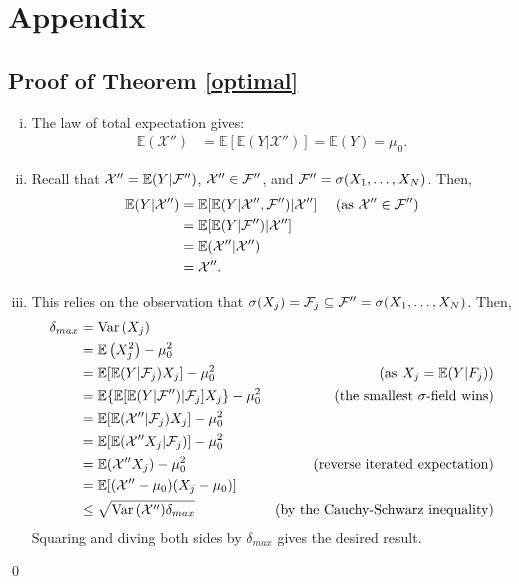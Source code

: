 \documentclass[11pt]{article}
\newcommand{\E}{\mathbb{E}}
\theoremstyle{definition}
\theoremstyle{definition}
\def\F{{\cal F}}
\def\E{{\mathbb E}}
\def\Var{{\rm Var}\,}
\begin{document}
\appendix
\section{Appendix}
\subsection{Proof of Theorem \ref{optimal}}
\begin{enumerate}[i)]
\item The law of total expectation gives:
\begin{align*}
\E(\mathcal{X}'') &= \E[\E(Y|\mathcal{X}'')] =  \E(Y) = \mu_0.
\end{align*}

\item Recall that $ \mathcal{X}'' = \E(Y | \F'')$, $\mathcal{X}'' \in \F''$, and $\F'' = \sigma(X_1, \dots, X_N)$. Then,
\begin{align*}
\E(Y | \mathcal{X}'') 
 &= \E[\E(Y|\mathcal{X}'',\F'')|\mathcal{X}''] & \text{ (as $\mathcal{X}'' \in \F''$)}\\
&= \E[\E(Y|\F'')|\mathcal{X}'']\\
&= \E(\mathcal{X}''|\mathcal{X}'') \\
&= \mathcal{X}''.
\end{align*}

\item This relies on the observation that $\sigma(X_j) = \F_j \subseteq \F'' = \sigma(X_1, \dots, X_N)$. Then,
\begin{align*}
\delta_{max} &=\Var(X_j)\\
 &= \E\left(X_j^2\right) - \mu_0^2\\
 &= \E[\E(Y|\F_j)X_j] - \mu_0^2 & \text{(as $X_j = \E(Y|F_j)$)}\\
 &= \E\{\E[\E(Y|\F'')|\F_j]X_j\} - \mu_0^2 & \text{(the smallest $\sigma$-field wins)}\\
 &= \E[\E(\mathcal{X}''|\F_j)X_j] - \mu_0^2 \\
 &= \E[\E(\mathcal{X}''X_j|\F_j)] - \mu_0^2 \\
 &= \E(\mathcal{X}''X_j) - \mu_0^2 & \text{(reverse iterated expectation)} \\
 &= \E[(\mathcal{X}''-\mu_0)(X_j-\mu_0)]  \\
 &\leq \sqrt{\Var(\mathcal{X}'')\delta_{max} } & \text{(by the Cauchy-Schwarz inequality)} 
\end{align*}
Squaring and diving both sides by $\delta_{max} $ gives the desired result. 

\end{enumerate}
\qed
\end{document}
